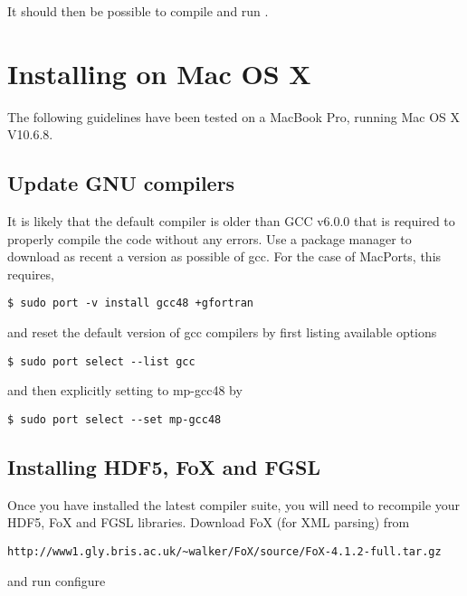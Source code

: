 It should then be possible to compile and run \glc.

\section{Installing on Mac OS X}

The following guidelines have been tested on a MacBook Pro, running Mac OS X V10.6.8. 

\subsection{Update GNU compilers}

It is likely that the default compiler is older than GCC v6.0.0 that is required to properly compile the code without any errors. Use a package manager to download as recent a version as possible of {\normalfont \ttfamily gcc}. For the case of MacPorts, this requires,

\begin{verbatim}
$ sudo port -v install gcc48 +gfortran
\end{verbatim}

and reset the default version of {\normalfont \ttfamily gcc} compilers by first listing available options

\begin{verbatim}
$ sudo port select --list gcc
\end{verbatim}

and then explicitly setting to {\normalfont \ttfamily mp-gcc48} by

\begin{verbatim}
$ sudo port select --set mp-gcc48
\end{verbatim}

\subsection{Installing HDF5, FoX and FGSL}

Once you have installed the latest compiler suite, you will need to recompile your {\normalfont \ttfamily HDF5}, {\normalfont \ttfamily FoX} and {\normalfont \ttfamily FGSL} libraries. Download {\normalfont \ttfamily FoX} (for XML parsing) from

\begin{verbatim}
http://www1.gly.bris.ac.uk/~walker/FoX/source/FoX-4.1.2-full.tar.gz
\end{verbatim}

and run {\normalfont \ttfamily configure}

